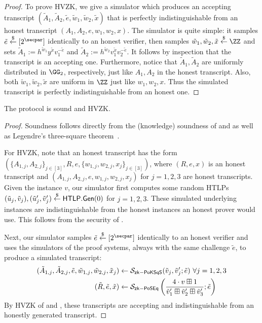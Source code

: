 \begin{proof}
    To prove HVZK, we give a simulator which produces an accepting transcript $(\tilde{A}_1, \tilde{A}_2, \tilde{e}, \tilde{w}_1, \tilde{w}_2, \tilde{x})$ that is perfectly indistinguishable from an honest transcript $(A_1, A_2, e, w_1, w_2, x)$. The simulator is quite simple: it samples $\tilde{e} \sample [2^\secpar]$ identically to an honest verifier, then samples $\tilde{w}_1, \tilde{w}_2, \tilde{x} \sample \ZZ$ and sets $\tilde{A}_1 := h^{\tilde{w}_1} y^{\tilde{x}} v_1^{-\tilde{e}}$ and $\tilde{A}_2 := h^{\tilde{w}_2} v_1^{\tilde{x}} v_2^{-\tilde{e}}$. It follows by inspection that the transcript is an accepting one. Furthermore, notice that $\tilde{A}_1, \tilde{A}_2$ are uniformly distributed in $\GG_2$, respectively, just like $A_1, A_2$ in the honest transcript. Also, both $\tilde{w}_1,\tilde{w}_2,\tilde{x}$ are uniform in $\ZZ$ just like $w_1, w_2, x$. Thus the simulated transcript is perfectly indistinguishable from an honest one.
\end{proof}

\begin{theorem}[\zkpopos]
    The protocol \zkpopos is sound and HVZK.
\end{theorem}
\begin{proof}
    Soundness follows directly from the (knowledge) soundness of \zkposqs and \zkposeq as well as Legendre's three-square theorem~\cite{ACNS:Groth05}.

    For HVZK, note that an honest \zkpopos transcript has the form $( \{A_{1,j},\allowbreak A_{2,j}\}_{j\in[3]},\allowbreak R, e, \{w_{1,j}, w_{2,j}, x_j\}_{j\in[3]})$, where $(R, e, x)$ is an honest \zkposeq transcript and $(A_{1,j}, A_{2,j}, e, w_{1,j}, w_{2,j}, x_j)$ for $j=1,2,3$ are honest \zkposqs transcripts. Given the instance $v$, our \zkpopos simulator first computes some random HTLPs $(\tilde{u}_j, \tilde{v}_j), (\tilde{u}_j', \tilde{v}_j') \stackrel{\$}{\gets} \mathsf{HTLP}.{\sf Gen}(0)$ for $j=1,2,3$. These simulated underlying instances are indistinguishable from the honest instances an honest prover would use. This follows from the security of \htlp.
    
    Next, our simulator samples $\tilde{e} \sample [2^\secpar]$ identically to an honest verifier and uses the simulators of the proof systems, always with the same challenge $\tilde{e}$, to produce a simulated transcript: 
    \begin{align*}
    (\tilde{A}_{1,j}, \tilde{A}_{2,j}, \tilde{e}, \tilde{w}_{1,j}, \tilde{w}_{2,j}, \tilde{x}_j) &\gets \mathcal{S}_{{\sf zk-PoKSqS}}(\tilde{v}_j, \tilde{v}_j'; \tilde{e}) ~\forall j=1,2,3\\
    (\tilde{R}, \tilde{e}, \tilde{x}) &\gets \mathcal{S}_{{\sf zk-PoSEq}}\left(\frac{4 \cdot v \boxplus 1}{\tilde{v}_1' \boxplus \tilde{v}_2' \boxplus \tilde{v}_3'}; \tilde{e}\right)
    \end{align*}
    By HVZK of \zkposqs and \zkposeq, these transcripts are accepting and indistinguishable from an honestly generated transcript.
\end{proof}
